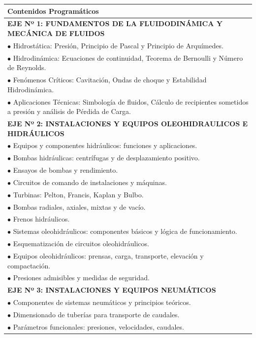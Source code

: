 \documentclass[11pt, a4paper]{article}
\begin{document}
\begin{longtable}{|p{\dimexpr\textwidth-2\tabcolsep-2\arrayrulewidth}|}
\hline
\rowcolor{gray!20} \textbf{Contenidos Programáticos} \\
\hline
\textbf{EJE Nº 1: FUNDAMENTOS DE LA FLUIDODINÁMICA Y MECÁNICA DE FLUIDOS} \\
$\bullet$ Hidrostática: Presión, Principio de Pascal y Principio de Arquímedes. \\
$\bullet$ Hidrodinámica: Ecuaciones de continuidad, Teorema de Bernoulli y Número de Reynolds. \\
$\bullet$ Fenómenos Críticos: Cavitación, Ondas de choque y Estabilidad Hidrodinámica. \\
$\bullet$ Aplicaciones Técnicas: Simbología de fluidos, Cálculo de recipientes sometidos a presión y análisis de Pérdida de Carga. \\
\hline
\textbf{EJE Nº 2: INSTALACIONES Y EQUIPOS OLEOHIDRAULICOS E HIDRÁULICOS} \\
$\bullet$ Equipos y componentes hidráulicos: funciones y aplicaciones. \\
$\bullet$ Bombas hidráulicas: centrífugas y de desplazamiento positivo. \\
$\bullet$ Ensayos de bombas y rendimiento. \\
$\bullet$ Circuitos de comando de instalaciones y máquinas. \\
$\bullet$ Turbinas: Pelton, Francis, Kaplan y Bulbo. \\
$\bullet$ Bombas radiales, axiales, mixtas y de vacío. \\
$\bullet$ Frenos hidráulicos. \\
$\bullet$ Sistemas oleohidráulicos: componentes básicos y lógica de funcionamiento. \\
$\bullet$ Esquematización de circuitos oleohidráulicos. \\
$\bullet$ Equipos oleohidráulicos: prensas, carga, transporte, elevación y compactación. \\
$\bullet$ Presiones admisibles y medidas de seguridad. \\
\hline
\textbf{EJE Nº 3: INSTALACIONES Y EQUIPOS NEUMÁTICOS} \\
$\bullet$ Componentes de sistemas neumáticos y principios teóricos. \\
$\bullet$ Dimensionado de tuberías para transporte de caudales. \\
$\bullet$ Parámetros funcionales: presiones, velocidades, caudales. \\

\end{longtable}
\end{document}
